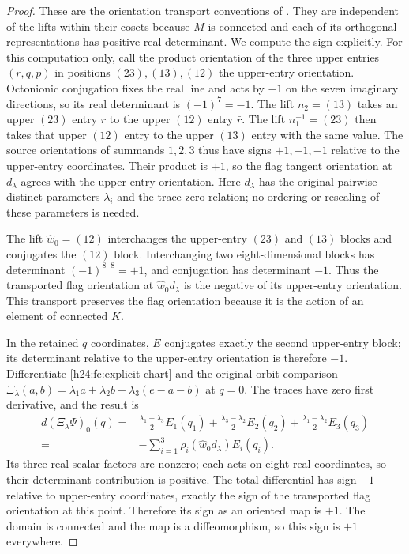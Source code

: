 \begin{proof}
These are the orientation transport conventions of
\cite[Section~3, pp.~495--496]{h24:MareWillems2013}.
They are independent of the lifts within their cosets because
$M$ is connected and each of its orthogonal representations has
positive real determinant.
We compute the sign explicitly. For this computation only, call
the product orientation of the three upper entries $(r,q,p)$ in
positions $(23),(13),(12)$ the upper-entry orientation. Octonionic
conjugation fixes the real line and acts by $-1$ on the seven
imaginary directions, so its real determinant is $(-1)^7=-1$.
The lift $n_2=(13)$ takes an upper $(23)$ entry $r$ to the upper
$(12)$ entry $\bar r$. The lift $n_1^{-1}=(23)$ then takes that
upper $(12)$ entry to the upper $(13)$ entry with the same value.
The source orientations of summands $1,2,3$ thus have signs
$+1,-1,-1$ relative to the upper-entry coordinates. Their product
is $+1$, so the flag tangent orientation at $d_\lambda$ agrees
with the upper-entry orientation. Here $d_\lambda$ has the original
pairwise distinct parameters $\lambda_i$ and the trace-zero relation;
no ordering or rescaling of these parameters is needed.

The lift $\widehat w_0=(12)$ interchanges the upper-entry
$(23)$ and $(13)$ blocks and conjugates the $(12)$ block.
Interchanging two eight-dimensional blocks has determinant
$(-1)^{8\cdot8}=+1$, and conjugation has determinant $-1$.
Thus the transported flag orientation at
$\widehat w_0d_\lambda$ is the negative of its upper-entry
orientation. This transport preserves the flag orientation because
it is the action of an element of connected $K$.

In the retained $q$ coordinates, $E$ conjugates exactly the second
upper-entry block; its determinant relative to the upper-entry
orientation is therefore $-1$. Differentiate
\eqref{h24:fc:explicit-chart} and the original orbit comparison
$\Xi_\lambda(a,b)=\lambda_1a+\lambda_2b+\lambda_3(e-a-b)$
at $q=0$. The traces have zero first derivative, and the result is
\begin{equation}
 \begin{split}
 d(\Xi_\lambda\Psi)_0(q)
 ={}&\frac{\lambda_1-\lambda_3}{2}E_1(q_1)
    +\frac{\lambda_3-\lambda_2}{2}E_2(q_2)
    +\frac{\lambda_1-\lambda_2}{2}E_3(q_3)\\
 ={}&-\sum_{i=1}^3\rho_i(\widehat w_0d_\lambda)E_i(q_i).
 \end{split}
 \label{h24:fc:chart-differential}
\end{equation}
Its three real scalar factors are nonzero; each acts on eight
real coordinates, so their determinant contribution is positive.
The total differential has sign $-1$ relative to upper-entry
coordinates, exactly the sign of the transported flag orientation
at this point. Therefore its sign as an oriented map is $+1$.
The domain is connected and the map is a diffeomorphism, so this
sign is $+1$ everywhere.
\end{proof}

